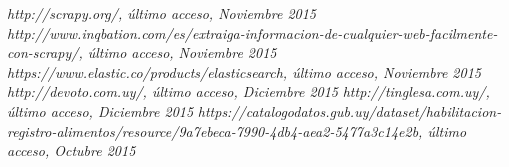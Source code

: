 \documentclass[12pt]{article} %
\begin{document}
\newpage

\begin{thebibliography}{1}
 \textit{http://scrapy.org/, último acceso, Noviembre 2015}
 \textit{http://www.inqbation.com/es/extraiga-informacion-de-cualquier-web-facilmente-con-scrapy/, último acceso, Noviembre 2015}
 \textit{https://www.elastic.co/products/elasticsearch, último acceso, Noviembre 2015}
 \textit{http://devoto.com.uy/, último acceso, Diciembre 2015}
 \textit{http://tinglesa.com.uy/, último acceso, Diciembre 2015}
 \textit{https://catalogodatos.gub.uy/dataset/habilitacion-registro-alimentos/resource/9a7ebeca-7990-4db4-aea2-5477a3c14e2b, último acceso, Octubre 2015}

\end{thebibliography}

\end{document}
